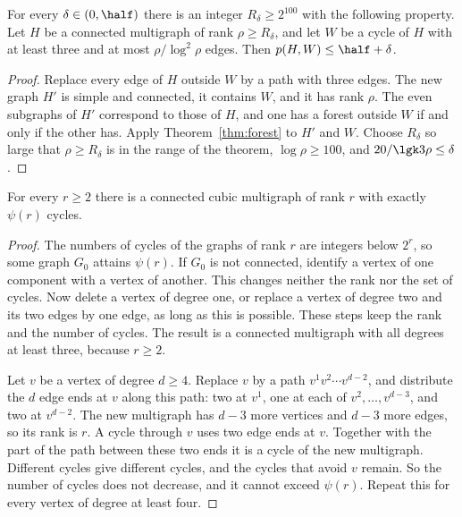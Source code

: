 \begin{proposition}\label{prop:input}
For every $\delta\in(0,\half)$ there is an integer $R_\delta\ge2^{100}$ with the following property.
Let $H$ be a connected multigraph of rank $\rho\ge R_\delta$, and let $W$ be a cycle of $H$ with at
least three and at most $\rho/\log^{2}\rho$ edges. Then $p(H,W)\le\half+\delta$.
\end{proposition}

\begin{proof}
Replace every edge of $H$ outside $W$ by a path with three edges. The new graph $H'$ is simple and
connected, it contains $W$, and it has rank $\rho$. The even subgraphs of $H'$ correspond to those
of $H$, and one has a forest outside $W$ if and only if the other has. Apply
Theorem~\ref{thm:forest} to $H'$ and $W$. Choose $R_\delta$ so large that $\rho\ge R_\delta$ is in
the range of the theorem, $\log\rho\ge100$, and $20/\lgk3\rho\le\delta$.
\end{proof}

\begin{lemma}\label{lem:cubic}
For every $r\ge2$ there is a connected cubic multigraph of rank $r$ with exactly $\psi(r)$ cycles.
\end{lemma}

\begin{proof}
The numbers of cycles of the graphs of rank $r$ are integers below $2^{r}$, so some graph $G_0$
attains $\psi(r)$. If $G_0$ is not connected, identify a vertex of one component with a vertex of
another. This changes neither the rank nor the set of cycles. Now delete a vertex of degree one, or
replace a vertex of degree two and its two edges by one edge, as long as this is possible. These
steps keep the rank and the number of cycles. The result is a connected multigraph with all
degrees at least three, because $r\ge2$.

Let $v$ be a vertex of degree $d\ge4$. Replace $v$ by a path $v^{1}v^{2}\cdots v^{d-2}$, and
distribute the $d$ edge ends at $v$ along this path: two at $v^{1}$, one at each of
$v^{2},\dots,v^{d-3}$, and two at $v^{d-2}$. The new multigraph has $d-3$ more vertices and $d-3$
more edges, so its rank is $r$. A cycle through $v$ uses two edge ends at $v$. Together with the
part of the path between these two ends it is a cycle of the new multigraph. Different cycles give
different cycles, and the cycles that avoid $v$ remain. So the number of cycles does not decrease,
and it cannot exceed $\psi(r)$. Repeat this for every vertex of degree at least four.
\end{proof}

